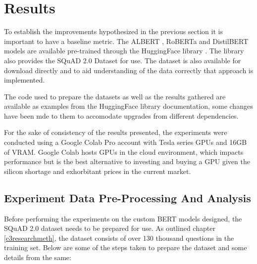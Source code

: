 \documentclass[a4paper,12pt]{report}
\begin{document}
    \chapter{Results}\label{c5}
    
        To establish the improvements hypothesized in the previous section it is important to have a baseline metric. The ALBERT \citep{albert}, RoBERTa \citep{roberta} and DistilBERT \citep{distil} models are available pre-trained through the HuggingFace library \citep{hfTransformers}. The library also provides the SQuAD 2.0 Dataset \citep{dataset} for use. The dataset is also available for download directly and to aid understanding of the data correctly that approach is implemented. 
        
        The code used to prepare the datasets as well as the results gathered are available as examples from the HuggingFace library documentation, some changes have been mde to them to accomodate upgrades from different dependencies.
        
        For the sake of consistency of the results presented, the experiments were conducted using a Google Colab Pro account with Tesla series GPUs and 16GB of VRAM. Google Colab hosts GPUs in the cloud environment, which impacts performance but is the best alternative to investing and buying a GPU given the silicon shortage and exhorbitant prices in the current market. 
        
        \section{Experiment Data Pre-Processing And Analysis}
        
        Before performing the experiments on the custom BERT models designed, the SQuAD 2.0 dataset needs to be prepared for use. As outlined chapter \ref{c3researchmeth}, the dataset consists of over 130 thousand questions in the training set. 
        Below are some of the steps taken to prepare the dataset and some details from the same:
        
\end{document}
